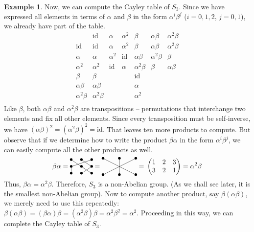 \documentclass[svgnames]{article}
\theoremstyle{definition}
\newtheorem{Example}[Example]{Example}
\theoremstyle{remark}
\newcommand{\id}{\mathrm{id}}
\newcommand{\newterm}[1]{{\color{alertcolor} #1}}
\begin{document}
\begin{appendices}
\begin{Example}
Now, we can compute the Cayley table of $S_3$. Since we have expressed all elements in terms of $\alpha$ and $\beta$ in the form $\alpha^i \beta^j$ ($i = 0, 1, 2$, $j = 0, 1$), we already have part of the table.
\begin{equation*}
\begin{array}{r|cccccc}
		&	\id		&	\alpha	&	\alpha^2	&	\beta	&	\alpha\beta	&	\alpha^2\beta\\
\hline
\id		&	\id		&	\alpha	&	\alpha^2	&	\beta	&	\alpha\beta	&	\alpha^2\beta\\
\alpha	&	\alpha	&	\alpha^2	&	\id		&	\alpha\beta	&	\alpha^2\beta	&	\beta\\
\alpha^2&	\alpha^2	&	\id	&	\alpha		&	\alpha^2\beta	&	\beta	&	\alpha\beta\\
\beta	&	\beta	&			&				&	\id		&					&	\\
\alpha\beta	&	\alpha\beta	&		&			&	\alpha	&					&	\\	
\alpha^2\beta	&	\alpha^2\beta	&		&			&	\alpha^2	&		&	\\
\end{array}
\end{equation*}
Like $\beta$, both $\alpha\beta$ and $\alpha^2\beta$ are \newterm{transpositions} -- permutations that interchange two elements and fix all other elements. Since every transposition must be self-inverse, we have $(\alpha\beta)^2 = (\alpha^2\beta)^2 = \id$. That leaves ten more products to compute. But observe that if we determine how to write the product $\beta\alpha$ in the form $\alpha^i \beta^j$, we can easily compute all the other products as well.
\begin{equation*}
\beta\alpha  = \,\vcenter{\xymatrix@R=1em@C=1.5em{
		*=0{\bullet} \ar@{-}[dr]	&	*=0{\bullet} \ar@{-}[dr]	&	*=0{\bullet} \ar@{-}[dll]\\
		*=0{\bullet} \ar@{-}[d]		&	*=0{\bullet} \ar@{-}[dr]	&	*=0{\bullet} \ar@{-}[dl]\\
		*=0{\bullet}				&	*=0{\bullet}				&	*=0{\bullet}\\		
}}\, = \,\vcenter{\xymatrix{
*=0{\bullet} \ar@{-}[drr]	&	*=0{\bullet} \ar@{-}[d]	&	*=0{\bullet} \ar@{-}[dll]\\
*=0{\bullet}				&	*=0{\bullet}				&	*=0{\bullet}\\
}}\, = \,\begin{pmatrix}
1 & 2 & 3\\
3 & 2 & 1
\end{pmatrix} = \alpha^2 \beta
\end{equation*}
Thus, $\beta\alpha = \alpha^2\beta$. Therefore, $S_3$ is a non-Abelian group. {\small (As we shall see later, it is the smallest non-Abelian group)}. Now to compute another product, say $\beta(\alpha\beta)$, we merely need to use this repeatedly: $\beta(\alpha\beta) = (\beta\alpha)\beta = (\alpha^2\beta)\beta = \alpha^2\beta^2 = \alpha^2$. Proceeding in this way, we can complete the Cayley table of $S_3$.

\end{Example}
\end{appendices}
\end{document}
